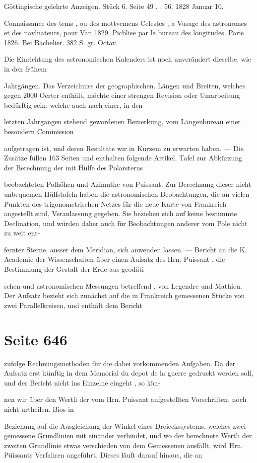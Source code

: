 \documentclass[10pt,a4paper]{article}
\begin{document}
Göttingische gelehrte Anzeigen. Stück 6. Seite 49 . . 56. 1828 Januar 10.

Connaissance des tems , ou des mottvemens Celestes , a Vusage des astronomes et des navlnateurs, pour Van 1829. Picbliee par le bureau des longitudes. Paris 1826. Bei Bachelier. 382 S. gr. Octav.

Die Einrichtung des astronomischen Kalenders ist noch unverändert dieselbe, wie in den frühem

Jahrgängen. Das Verzeichniss der geographischen. Längen und Breiten, welches gegen 2000 Oerter enthält, möchte einer strengen Revision oder Umarbeitung bedürftig sein, welche auch nach einer, in den

letzten Jahrgängen stehend gewordenen Bemerkung, vom Längenbureau einer besondern Commission

aufgetragen ist, und deren Resultate wir in Kurzem zu erwarten haben. — Die Zusätze füllen 163 Seiten und enthalten folgende Artikel. Tafel zur Abkürzung der Berechnung der mit Hülfe des Polarsterns

beobachteten Polhöhen und Azimuthe von Puissant. Zur Berechnung dieser nicht unbequemen Hülfstafeln haben die astronomischen Beobachtungen, die an vielen Punkten des trigonometrischen Netzes für die neue Karte von Frankreich angestellt sind, Veranlassung gegeben. Sie beziehen sich auf keine bestimmte Declination, und würden daher auch für Beobachtungen anderer vom Pole nicht zu weit ent-

fernter Sterne, ausser dem Meridian, sich anwenden lassen. — Bericht an die K. Academie der Wissenschaften über einen Aufsatz des Hrn. Puissant , die Bestimmung der Gestalt der Erde aus geodäti-

schen und astronomischen Messungen betreffend , von Legendre und Mathieu. Der Aufsatz bezieht sich zunächst auf die in Frankreich gemessenen Stücke von zwei Parallelkreisen, und enthält dem Bericht


\newpage
\section*{Seite 646}
zufolge Rechnungsmethoden für die dabei vorkommenden Aufgaben. Da der Aufsatz erst künftig in dem Memorial du depot de la guerre gedruckt werden soll, und der Bericht nicht ins Einzelne eingeht , so kön-

nen wir über den Wertli der vom Hrn. Puissant aufgestellten Vorschriften, noch nicht urtheilen. Bios in

Beziehung auf die Ausgleichung der Winkel eines Dreieckssystems, welches zwei gemessene Grundlinien mit einander verbindet, und wo der berechnete Werth der zweiten Grundlinie etwas verschieden von dem Gemessenen ausfällt, wird Hrn. Püissants Verfaliren angeführt. Dieses läuft darauf hinaus, die an
\end{document}
